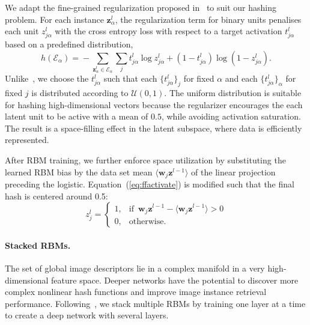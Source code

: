 \documentclass[10pt,twocolumn,letterpaper]{article}
\begin{document}
We adapt the fine-grained regularization proposed in~\cite{hanlinSparsity} to suit our hashing problem. For each instance $\mathbf{z}^{l}_{\alpha}$, the regularization term for binary units penalises each unit $z_{j\alpha}^{l}$ with the cross entropy loss with respect to a target activation $t_{j\alpha}^{l}$ based on a predefined distribution,
\begin{equation}
h(\mathcal{E}_{\alpha})\!=\!-\!\!\!\!\sum_{\mathbf{z}^{l}_{\alpha}\in\mathcal{E}_{\alpha}}\!\!\!\sum_{j} t^{l}_{j\alpha}\log z^{l}_{j\alpha}\!+(1-t^{l}_{j\alpha})\log(1-z^{l}_{j\alpha}).\!\!
\end{equation}
Unlike~\cite{hanlinSparsity}, we choose the $t_{j\alpha}^{l}$ such that each $\{t_{j\alpha}^{l}\}_{j}$ for fixed $\alpha$ 
and each $\{t_{j\alpha}^{l}\}_{\alpha}$ for fixed $j$ is distributed according to $\mathcal{U}(0,1)$.
The uniform distribution is suitable for hashing high-dimensional vectors because the regularizer encourages the each latent unit to be active with a mean of $0.5$, while avoiding activation saturation. The result is a space-filling effect in the latent subspace, where data is efficiently represented.

After RBM training, we further enforce space utilization by substituting the learned RBM bias by the data set mean $\langle\mathbf{w}_{j} \mathbf{z}^{l-1}\rangle$ of the linear projection preceding the logistic. 
Equation~(\ref{eq:ffactivate}) is modified such that the final hash is centered around 0.5:
\begin{equation}
z^{l}_j=\begin{cases}
1,& \text{if } \,\mathbf{w}_{j} \mathbf{z}^{l-1}\!-\!\langle\mathbf{w}_{j} \mathbf{z}^{l-1}\rangle\!>\!0\\
    0,              & \text{otherwise}.
\end{cases}
\label{eq:biastrick}
\end{equation}


\paragraph{Stacked RBMs.}
The set of global image descriptors lie in a complex manifold in a very high-dimensional feature space. Deeper networks have the potential to discover more complex nonlinear hash functions and improve image instance retrieval performance. Following~\cite{HintonDBN}, we stack multiple RBMs by training one layer at a time to create a deep network with several layers.
\end{document}
